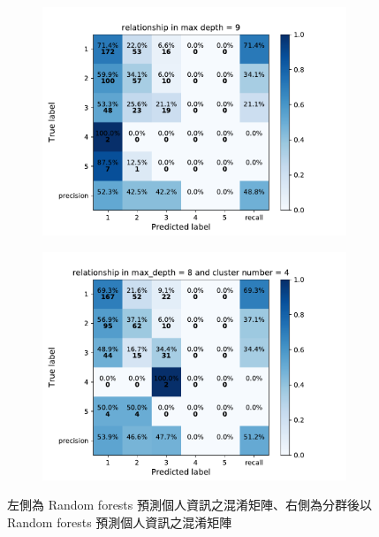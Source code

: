 {\begin{figure}[h]
    \centering
    \begin{subfigure}
      \centering
      \includegraphics[scale=0.45]{fig/super_rf_relationship.pdf}
    \end{subfigure}%
    \begin{subfigure}
      \centering
      \includegraphics[scale=0.45]{fig/kms_rf_relationship.pdf}
    \end{subfigure}
    \caption{左側為 Random forests 預測個人資訊之混淆矩陣、右側為分群後以 Random forests 預測個人資訊之混淆矩陣}
    \label{fig:rf_con}
\end{figure}

}

